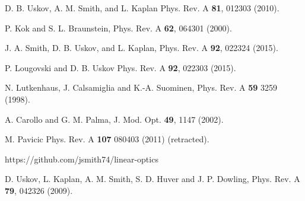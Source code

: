\documentclass[aps,pra,twocolumn,showpacs,superscriptaddress,floatfix,10pt]{revtex4}
\begin{document}
\begin{thebibliography}{99}
 D. B. Uskov, A. M. Smith, and L. Kaplan
Phys. Rev. A {\bf 81}, 012303 (2010).

 P. Kok and S. L. Braunstein, Phys. Rev. A {\bf 62}, 064301 (2000).

 J. A. Smith, D. B. Uskov, and L. Kaplan, Phys. Rev. A {\bf 92}, 022324 (2015).

 P. Lougovski and D. B. Uskov Phys. Rev. A {\bf 92}, 022303 (2015).

 N. Lutkenhaus, J. Calsamiglia and K.-A. Suominen, Phys. Rev. A {\bf 59} 3259 (1998).

 A. Carollo and G. M. Palma, J. Mod. Opt. {\bf 49}, 1147 (2002).

 M. Pavicic Phys. Rev. A {\bf 107} 080403 (2011) (retracted).

 https://github.com/jsmith74/linear-optics

 D. Uskov, L. Kaplan, A. M. Smith, S. D. Huver and J. P. Dowling, Phys. Rev. A {\bf 79}, 042326 (2009).


\end{thebibliography}
\end{document}
